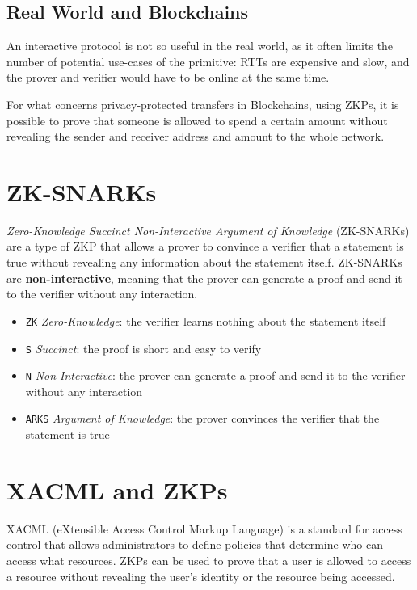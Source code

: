 \subsection{Real World and Blockchains}

An interactive protocol is not so useful in the real world, as it often limits the number of potential use-cases of the primitive:
RTTs are expensive and slow, and the prover and verifier would have to be online at the same time.

For what concerns privacy-protected transfers in Blockchains, using ZKPs, it is possible to prove that someone is allowed to spend a certain amount without revealing the sender and receiver address and amount to the whole network.

\section{ZK-SNARKs}

\textit{Zero-Knowledge Succinct Non-Interactive Argument of Knowledge} (ZK-SNARKs) are a type of ZKP that allows a prover to convince a verifier that a statement is true without revealing any information about the statement itself. ZK-SNARKs are \textbf{non-interactive}, meaning that the prover can generate a proof and send it to the verifier without any interaction.
\begin{itemize}
   \item \texttt{ZK} \textit{Zero-Knowledge}: the verifier learns nothing about the statement itself
   \item \texttt{S} \textit{Succinct}: the proof is short and easy to verify
   \item \texttt{N} \textit{Non-Interactive}: the prover can generate a proof and send it to the verifier without any interaction
   \item \texttt{ARKS} \textit{Argument of Knowledge}: the prover convinces the verifier that the statement is true
\end{itemize}


\section{XACML and ZKPs}
XACML (eXtensible Access Control Markup Language) is a standard for access control that allows administrators to define policies that determine who can access what resources. ZKPs can be used to prove that a user is allowed to access a resource without revealing the user's identity or the resource being accessed.

